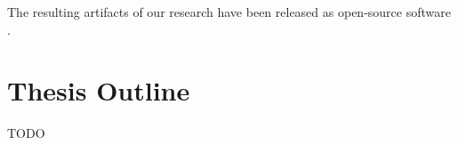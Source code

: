The resulting artifacts of our research have been released as open-source software \cite{thesis-github}.


\section{Thesis Outline}
TODO



\iffalse
Here you explain the structure of the thesis.

\begin{example}
The thesis is structured in the following way:
\begin{itemize}
\item In \autoref{ch:preliminaries_and_sota}, we present ... .
\item In \autoref{ch:problem_formulation}, we formulate the problem we address in the thesis and ... .
\item In \autoref{ch:design}, we present our solution for ... .
\item In \autoref{ch:experiments}, we show experimental results of our proposed methods in different settings ... .
\item Finally, in \autoref{ch:conclusions}, we present our conclusions and possible future paths toward which our work could be extended.
\end{itemize}
\end{example}
\fi
